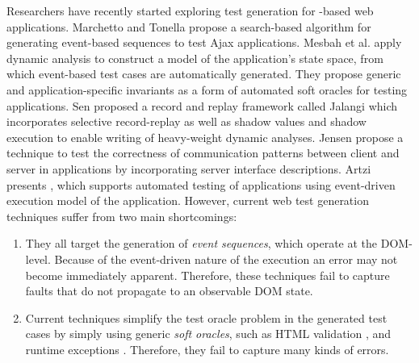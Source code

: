 Researchers have recently started exploring test generation for \javascript-based web applications.
Marchetto and Tonella \cite{marchetto:search} propose a search-based algorithm for generating event-based sequences to test Ajax applications. 
Mesbah et al.  \cite{mesbah:tweb11} apply dynamic analysis to construct a model of the application's state space, from which event-based test cases are automatically generated. They propose \cite{mesbah:tse12} generic and application-specific invariants as a form of automated soft oracles for testing \ajax applications. 
Sen \etal \cite{sen:fse13} proposed a record and replay framework called Jalangi which incorporates selective record-replay as well as shadow values and shadow execution to enable writing of heavy-weight dynamic analyses. %
Jensen \etal \cite{jensen:fse13} propose a technique to test the correctness of communication patterns between client and server in \ajax applications by incorporating server interface descriptions.
Artzi \etal \cite{artzi:icse11} presents \artemis, which supports automated testing of \javascript applications using event-driven execution model of the application. %
However, current web test generation techniques suffer from two main  shortcomings:
\begin{enumerate} 
\item They all target the generation of \emph{event sequences}, which operate at the DOM-level. 
Because of the event-driven nature of the execution an error may not become immediately apparent. Therefore, these techniques fail to capture faults that  do not propagate to an observable DOM state. %
\item Current techniques  simplify the test oracle problem in the generated test cases by simply using generic \emph{soft oracles}, such as  HTML validation \cite{mesbah:tse12, artzi:icse11}, and runtime exceptions \cite{artzi:icse11}. Therefore, they fail to capture many kinds of errors.
\end{enumerate}

